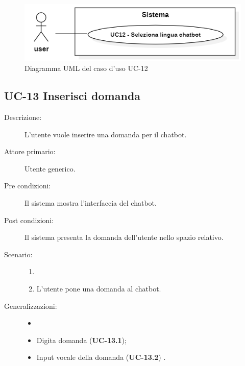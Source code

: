 \begin{figure}[H]
    \centering
    \includegraphics[width=0.8\linewidth]{UC12.png} %
    \caption{Diagramma UML del caso d'uso UC-12}
    \label{fig:UC15}
\end{figure}

\subsection{UC-13 Inserisci domanda}
\begin{description}
    \item[Descrizione:] L'utente vuole inserire una domanda per il chatbot.
    \item[Attore primario:] Utente generico.
    \item[Pre condizioni:] Il sistema mostra l'interfaccia del chatbot.
    \item[Post condizioni:] Il sistema presenta la domanda dell'utente nello spazio relativo.
    \item[Scenario:]
    \begin{enumerate}
        \item[]
        \item L’utente pone una domanda al chatbot.
    \end{enumerate}
    \item[Generalizzazioni:] 
    \begin{itemize}
        \item[] 
        \item Digita domanda (\textbf{UC-13.1});
        \item Input vocale della domanda (\textbf{UC-13.2}) .
    \end{itemize}
\end{description}


